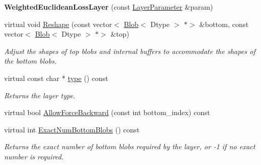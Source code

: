 \begin{DoxyCompactItemize}
{\bfseries Weighted\+Euclidean\+Loss\+Layer} (const \mbox{\hyperlink{classcaffe_1_1_layer_parameter}{Layer\+Parameter}} \&param)
\item 
virtual void \mbox{\hyperlink{classcaffe_1_1_weighted_euclidean_loss_layer_ac9b915b132fb539ffdd610992c507974}{Reshape}} (const vector$<$ \mbox{\hyperlink{classcaffe_1_1_blob}{Blob}}$<$ Dtype $>$ $\ast$$>$ \&bottom, const vector$<$ \mbox{\hyperlink{classcaffe_1_1_blob}{Blob}}$<$ Dtype $>$ $\ast$$>$ \&top)
\begin{DoxyCompactList}\small\item\em Adjust the shapes of top blobs and internal buffers to accommodate the shapes of the bottom blobs. \end{DoxyCompactList}\item 
\mbox{\label{classcaffe_1_1_weighted_euclidean_loss_layer_a3c470122857ae006730dadf26a015b79}} 
virtual const char $\ast$ \mbox{\hyperlink{classcaffe_1_1_weighted_euclidean_loss_layer_a3c470122857ae006730dadf26a015b79}{type}} () const
\begin{DoxyCompactList}\small\item\em Returns the layer type. \end{DoxyCompactList}\item 
virtual bool \mbox{\hyperlink{classcaffe_1_1_weighted_euclidean_loss_layer_a6b996834a2a27bb8d2d9b48873b6cd65}{Allow\+Force\+Backward}} (const int bottom\+\_\+index) const
\item 
virtual int \mbox{\hyperlink{classcaffe_1_1_weighted_euclidean_loss_layer_a2ac1ab6f657c6531dee37f80a971bbd9}{Exact\+Num\+Bottom\+Blobs}} () const
\begin{DoxyCompactList}\small\item\em Returns the exact number of bottom blobs required by the layer, or -\/1 if no exact number is required. \end{DoxyCompactList}\end{DoxyCompactItemize}
